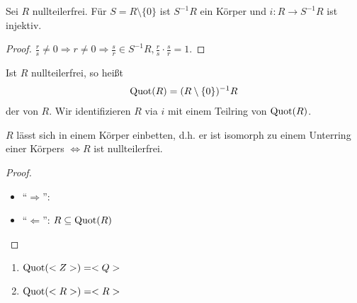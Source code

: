 \begin{conclusion}
	Sei $R$ nullteilerfrei. Für $S = R \setminus \{0\}$ ist $S^{-1}R$ ein Körper und $i: R \to S^{-1}R$ ist injektiv.
\end{conclusion}

\begin{proof}
	$\frac{r}{s} \neq 0 \Rightarrow r \neq 0 \Rightarrow \frac{s}{r} \in S^{-1}R, \frac{r}{s}\cdot \frac{s}{r} = 1.$
\end{proof}

\begin{definition}
	Ist $R$ nullteilerfrei, so heißt
	\begin{align}
		\operatorname{Quot}(R) = (R\setminus \{0\})^{-1}R\notag
	\end{align}
	der  von $R$. Wir identifizieren $R$ via $i$ mit einem Teilring von $\operatorname{Quot}(R)$.
\end{definition}

\begin{conclusion}
	$R$ lässt sich in einem Körper einbetten, d.h. er ist isomorph zu einem Unterring einer Körpers $\Leftrightarrow R$ ist nullteilerfrei.
\end{conclusion}

\begin{proof}
	\begin{itemize}
	\item ``$\Rightarrow$'': 
	\item ``$\Leftarrow$'': $R \subseteq \operatorname{Quot}(R)$
	\end{itemize}
\end{proof}

\begin{example}
	\begin{enumerate}
	\item $\operatorname{Quot}(<Z>) = <Q>$
	\item $\operatorname{Quot}(<R>) = <R>$
	\end{enumerate}
\end{example}